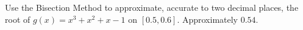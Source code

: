 {Use the Bisection Method to approximate, accurate to two decimal places, the root of $g(x) = x^3+x^2+x-1$ on $[0.5,0.6]$.
}
{Approximately $0.54$.
}
